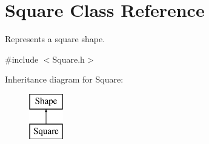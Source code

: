 \hypertarget{class_square}{}\section{Square Class Reference}
\label{class_square}


Represents a square shape.  




{\ttfamily \#include $<$Square.\+h$>$}

Inheritance diagram for Square\+:\begin{figure}[H]
\begin{center}
\leavevmode
\includegraphics[height=2.000000cm]{class_square}
\end{center}
\end{figure}
